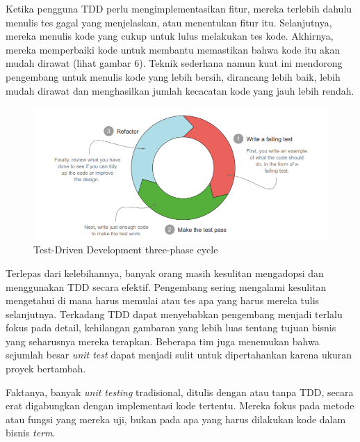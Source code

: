 \documentclass[a4paper,twoside]{article}
\begin{document}
\begin{enumerate}
Ketika pengguna TDD perlu mengimplementasikan fitur, mereka terlebih dahulu menulis tes gagal yang menjelaskan, atau menentukan fitur itu. Selanjutnya, mereka menulis kode yang cukup untuk lulus melakukan tes kode. Akhirnya, mereka memperbaiki kode untuk membantu memastikan bahwa kode itu akan mudah dirawat (lihat gambar 6). Teknik sederhana namun kuat ini mendorong pengembang untuk menulis kode yang lebih bersih, dirancang lebih baik, lebih mudah dirawat dan menghasilkan jumlah kecacatan kode yang jauh lebih rendah.

\begin{figure}
	\includegraphics[scale=1.2]{../DokumenSkripsi/gambar/bdd}
	\centering
	\caption{Test-Driven Development three-phase cycle}
\end{figure}
Terlepas dari kelebihannya, banyak orang masih kesulitan mengadopsi dan menggunakan TDD secara efektif. Pengembang sering mengalami kesulitan mengetahui di mana harus memulai atau tes apa yang harus mereka tulis selanjutnya. Terkadang TDD dapat menyebabkan pengembang menjadi terlalu fokus pada detail, kehilangan gambaran yang lebih luas tentang tujuan bisnis yang seharusnya mereka terapkan. Beberapa tim juga menemukan bahwa sejumlah besar \textit{unit test} dapat menjadi sulit untuk dipertahankan karena ukuran proyek bertambah.

Faktanya, banyak \textit{unit testing} tradisional, ditulis dengan atau tanpa TDD, secara erat digabungkan dengan implementasi kode tertentu. Mereka fokus pada metode atau fungsi yang mereka uji, bukan pada apa yang harus dilakukan kode dalam  bisnis \textit{term}.


\end{enumerate}
\end{document}
